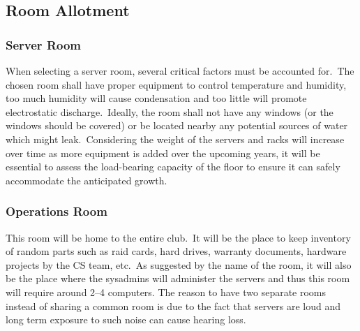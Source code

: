 \subsection{Room Allotment}\label{subsec:room-allotment}

\subsubsection{Server Room}
When selecting a server room, several critical factors must be accounted for.\ The chosen room shall have proper
equipment to control temperature and humidity, too much humidity will cause condensation and too little will promote
electrostatic discharge.\ Ideally, the room shall not have any windows (or the windows should be covered) or be located
nearby any potential sources of water which might leak.\ Considering the weight of the servers and racks will increase
over time as more equipment is added over the upcoming years, it will be essential to assess the load-bearing capacity
of the floor to ensure it can safely accommodate the anticipated growth.

\subsubsection{Operations Room}
This room will be home to the entire club.\ It will be the place to keep inventory of random parts such as raid cards,
hard drives, warranty documents, hardware projects by the CS team, etc.\ As suggested by the name of the room, it will
also be the place where the sysadmins will administer the servers and thus this room will require around 2--4 computers.
The reason to have two separate rooms instead of sharing a common room is due to the fact that servers are loud and long
term exposure to such noise can cause hearing loss.


